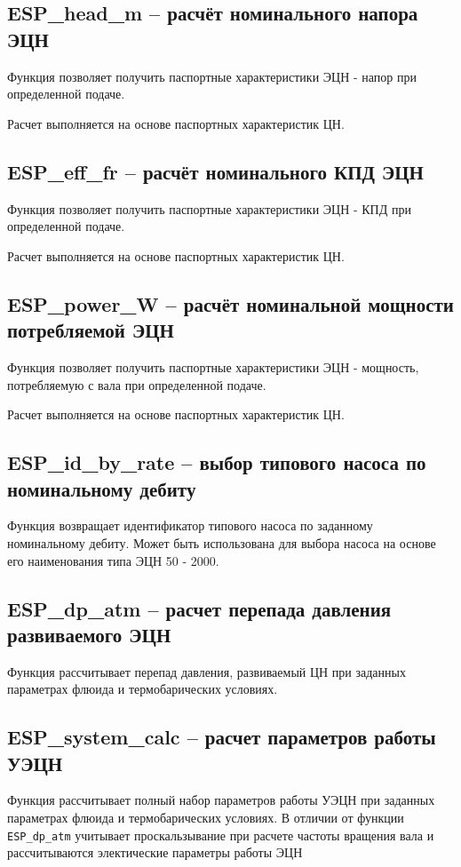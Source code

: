 \subsection{ESP\_head\_m – расчёт номинального напора ЭЦН}
Функция позволяет получить паспортные характеристики ЭЦН - напор при определенной подаче. 


Расчет выполняется на основе паспортных характеристик ЦН. 

\subsection{ESP\_eff\_fr – расчёт номинального КПД ЭЦН}
Функция позволяет получить паспортные характеристики ЭЦН - КПД  при определенной подаче. 


Расчет выполняется на основе паспортных характеристик ЦН. 

\subsection{ESP\_power\_W – расчёт номинальной мощности потребляемой ЭЦН}
Функция позволяет получить паспортные характеристики ЭЦН - мощность, потребляемую с вала при определенной подаче. 


Расчет выполняется на основе паспортных характеристик ЦН. 

\subsection{ESP\_id\_by\_rate – выбор типового насоса по номинальному дебиту}
Функция возвращает идентификатор типового насоса по заданному номинальному дебиту. 
Может быть использована для выбора насоса на основе его наименования типа ЭЦН 50 - 2000.

\subsection{ESP\_dp\_atm – расчет перепада давления развиваемого ЭЦН}
Функция рассчитывает перепад давления, развиваемый ЦН при заданных параметрах флюида и термобарических условиях.

\subsection{ESP\_system\_calc – расчет параметров работы УЭЦН}
Функция рассчитывает полный набор параметров работы УЭЦН при заданных параметрах флюида и термобарических условиях. В отличии от функции  \texttt{ESP\_dp\_atm} учитывает проскальзывание при расчете частоты вращения вала и рассчитываются электические параметры работы ЭЦН


